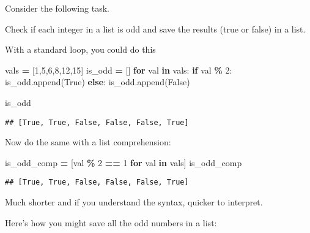 \documentclass[
]{book}
\newenvironment{Shaded}{\begin{snugshade}}{\end{snugshade}}
\newcommand{\ControlFlowTok}[1]{\textcolor[rgb]{0.13,0.29,0.53}{\textbf{#1}}}
\newcommand{\DecValTok}[1]{\textcolor[rgb]{0.00,0.00,0.81}{#1}}
\newcommand{\KeywordTok}[1]{\textcolor[rgb]{0.13,0.29,0.53}{\textbf{#1}}}
\newcommand{\NormalTok}[1]{#1}
\newcommand{\OperatorTok}[1]{\textcolor[rgb]{0.81,0.36,0.00}{\textbf{#1}}}
\newcommand{\VariableTok}[1]{\textcolor[rgb]{0.00,0.00,0.00}{#1}}
\begin{document}
Consider the following task.

Check if each integer in a list is odd and save the results (true or false) in a list.

With a standard loop, you could do this

\begin{Shaded}
\begin{Highlighting}[]
\NormalTok{vals }\OperatorTok{=}\NormalTok{ [}\DecValTok{1}\NormalTok{,}\DecValTok{5}\NormalTok{,}\DecValTok{6}\NormalTok{,}\DecValTok{8}\NormalTok{,}\DecValTok{12}\NormalTok{,}\DecValTok{15}\NormalTok{]}
\NormalTok{is\_odd }\OperatorTok{=}\NormalTok{ []}
\ControlFlowTok{for}\NormalTok{ val }\KeywordTok{in}\NormalTok{ vals:   }
    \ControlFlowTok{if}\NormalTok{ val }\OperatorTok{\%} \DecValTok{2}\NormalTok{:}
\NormalTok{        is\_odd.append(}\VariableTok{True}\NormalTok{)}
    \ControlFlowTok{else}\NormalTok{:       }
\NormalTok{        is\_odd.append(}\VariableTok{False}\NormalTok{)}
\end{Highlighting}
\end{Shaded}

\begin{Shaded}
\begin{Highlighting}[]
\NormalTok{is\_odd}
\end{Highlighting}
\end{Shaded}

\begin{verbatim}
## [True, True, False, False, False, True]
\end{verbatim}

Now do the same with a list comprehension:

\begin{Shaded}
\begin{Highlighting}[]
\NormalTok{is\_odd\_comp }\OperatorTok{=}\NormalTok{ [val }\OperatorTok{\%} \DecValTok{2} \OperatorTok{==} \DecValTok{1} \ControlFlowTok{for}\NormalTok{ val }\KeywordTok{in}\NormalTok{ vals]}
\NormalTok{is\_odd\_comp}
\end{Highlighting}
\end{Shaded}

\begin{verbatim}
## [True, True, False, False, False, True]
\end{verbatim}

Much shorter and if you understand the syntax, quicker to interpret.

Here's how you might save all the odd numbers in a list:
\end{document}
